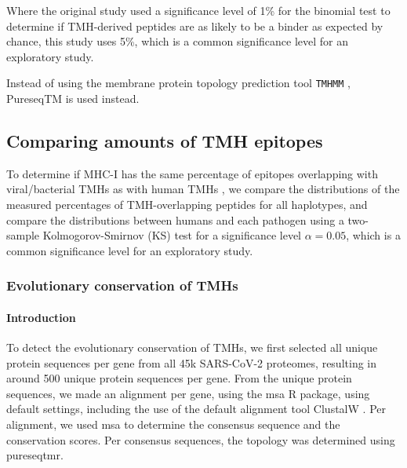 Where the original study used a significance level of 1\% 
for the binomial test to determine if TMH-derived peptides 
are as likely to be a binder as expected by chance, this study
uses 5\%, which is a common significance level for an exploratory study.

Instead of using the membrane protein topology prediction
tool \verb;TMHMM; \cite{krogh2001predicting}, PureseqTM \cite{wang2019efficient}
is used instead.

\subsection{Comparing amounts of TMH epitopes}

To determine if MHC-I has the same percentage of epitopes overlapping
with viral/bacterial TMHs as with human TMHs , 
we compare the distributions of the measured percentages 
of TMH-overlapping peptides for all haplotypes,
and compare the distributions between humans and each pathogen
using a two-sample Kolmogorov-Smirnov (KS) test
for a significance level $\alpha = 0.05$, 
which is a common significance level for an exploratory study.

\subsubsection{Evolutionary conservation of TMHs}

\paragraph{Introduction}

To detect the evolutionary conservation of TMHs,
we first selected all unique protein sequences per
gene from all 45k SARS-CoV-2 proteomes,
resulting in around 500 unique protein sequences per gene.
From the unique protein sequences, we made an alignment per gene,
using the msa \cite{bodenhofer2015msa} R package, 
using default settings, including the use of the default alignment tool
ClustalW \cite{thompson1994clustal}.
Per alignment, we used msa to determine the consensus sequence
and the conservation scores.
Per consensus sequences, the topology was determined using pureseqtmr.


